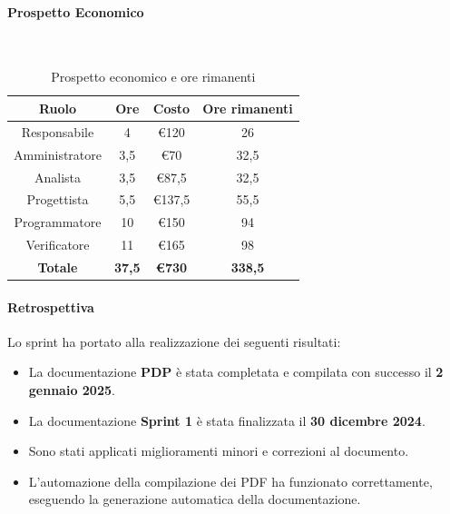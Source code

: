 \documentclass{article}
\begin{document}
                \paragraph{Prospetto Economico}\mbox{}\\
                \begin{table}[H]
                    \centering
                    \begin{tabular}{|c|c|c|c|}
                    \hline
                    \textbf{Ruolo}  & \textbf{Ore}  & \textbf{Costo} & \textbf{Ore rimanenti} \\ \hline
                    Responsabile    & 4             & €120            & 26                     \\ \hline
                    Amministratore  & 3,5           & €70            & 32,5                   \\ \hline
                    Analista        & 3,5           & €87,5          & 32,5                   \\ \hline
                    Progettista     & 5,5           & €137,5         & 55,5                   \\ \hline
                    Programmatore   & 10            & €150           & 94                    \\ \hline
                    Verificatore    & 11            & €165           & 98                    \\ \hline
                    \textbf{Totale} & \textbf{37,5} & \textbf{\euro730}   & \textbf{338,5}         \\ \hline
                    \end{tabular}
                    \caption{Prospetto economico e ore rimanenti}
                \end{table}

                \paragraph{Retrospettiva}
                Lo sprint ha portato alla realizzazione dei seguenti risultati:
                \begin{itemize}
                    \item La documentazione \textbf{PDP} è stata completata e compilata con successo il \textbf{2 gennaio 2025}.
                    \item La documentazione \textbf{Sprint 1} è stata finalizzata il \textbf{30 dicembre 2024}.
                    \item Sono stati applicati miglioramenti minori e correzioni al documento.
                    \item L'automazione della compilazione dei PDF ha funzionato correttamente, eseguendo la generazione automatica della documentazione.
                \end{itemize}
                
\end{document}
